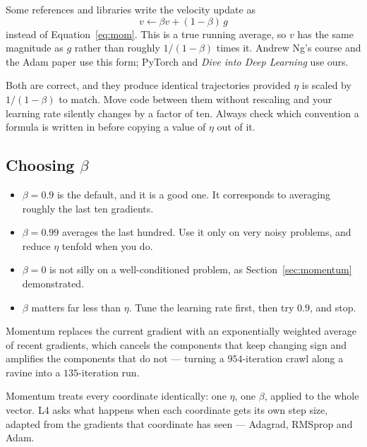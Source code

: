 \documentclass[11pt]{article}
\begin{document}
\begin{caution}
Some references and libraries write the velocity update as
\[
  v \leftarrow \beta v + (1-\beta)\, g
\]
instead of Equation~\eqref{eq:mom}. This is a true running average, so $v$ has
the same magnitude as $g$ rather than roughly $1/(1-\beta)$ times it. Andrew
Ng's course and the Adam paper use this form; PyTorch and \emph{Dive into Deep
Learning} use ours.

Both are correct, and they produce identical trajectories provided $\eta$ is
scaled by $1/(1-\beta)$ to match. Move code between them without rescaling and
your learning rate silently changes by a factor of ten. Always check which
convention a formula is written in before copying a value of $\eta$ out of it.
\end{caution}

\subsection{Choosing $\beta$}

\begin{itemize}[leftmargin=*]
  \item $\beta = 0.9$ is the default, and it is a good one. It corresponds to
    averaging roughly the last ten gradients.
  \item $\beta = 0.99$ averages the last hundred. Use it only on very noisy
    problems, and reduce $\eta$ tenfold when you do.
  \item $\beta = 0$ is not silly on a well-conditioned problem, as
    Section~\ref{sec:momentum} demonstrated.
  \item $\beta$ matters far less than $\eta$. Tune the learning rate first,
    then try $0.9$, and stop.
\end{itemize}

\begin{keyidea}
Momentum replaces the current gradient with an exponentially weighted average
of recent gradients, which cancels the components that keep changing sign and
amplifies the components that do not --- turning a $954$-iteration crawl along
a ravine into a $135$-iteration run.
\end{keyidea}

Momentum treats every coordinate identically: one $\eta$, one $\beta$, applied
to the whole vector. L4 asks what happens when each coordinate gets its own
step size, adapted from the gradients that coordinate has seen --- Adagrad,
RMSprop and Adam.
\end{document}
